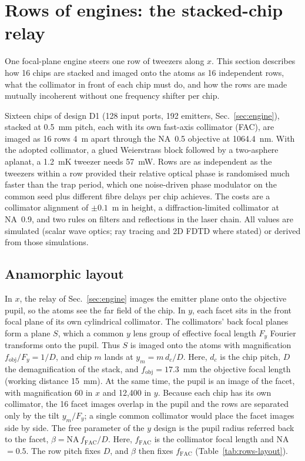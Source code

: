 \section{Rows of engines: the stacked-chip relay}\label{sec:rows}

One focal-plane engine steers one row of tweezers along $x$. This section describes how 16 chips are stacked
and imaged onto the atoms as 16 independent rows, what the collimator in front of each chip must do, and how
the rows are made mutually incoherent without one frequency shifter per chip.

Sixteen chips of design D1 (128 input ports, 192 emitters, Sec.~\ref{sec:engine}), stacked at 0.5~mm pitch,
each with its own fast-axis collimator (FAC), are imaged as 16 rows 4~\textmu m apart through the NA~0.5
objective at 1064.4~nm. With the adopted collimator, a glued Weierstrass block followed by a two-asphere
aplanat, a 1.2~mK tweezer needs 57~mW. Rows are as independent as the tweezers within a row provided their
relative optical phase is randomised much faster than the trap period, which one noise-driven phase modulator
on the common seed plus different fibre delays per chip achieves. The costs are a collimator alignment of
$\pm0.1$~\textmu m in height, a diffraction-limited collimator at NA~0.9, and two rules on filters and
reflections in the laser chain. All values are simulated (scalar wave optics; ray tracing and 2D FDTD where
stated) or derived from those simulations.

\subsection{Anamorphic layout}\label{sec:rows-layout}

In $x$, the relay of Sec.~\ref{sec:engine} images the emitter plane onto the objective pupil, so the atoms see
the far field of the chip. In $y$, each facet sits in the front focal plane of its own cylindrical collimator.
The collimators' back focal planes form a plane $S$, which a common $y$ lens group of effective focal length
$F_y$ Fourier transforms onto the pupil. Thus $S$ is imaged onto the atoms with magnification
$f_\mathrm{obj}/F_y=1/D$, and chip $m$ lands at $y_m=m\,d_c/D$. Here, $d_c$ is the chip pitch, $D$ the
demagnification of the stack, and $f_\mathrm{obj}=17.3$~mm the objective focal length (working distance 15~mm).
At the same time, the pupil is an image of the facet, with magnification 60 in $x$ and 12,400 in $y$. Because
each chip has its own collimator, the 16 facet images overlap in the pupil and the rows are separated only by
the tilt $y_m/F_y$; a single common collimator would place the facet images side by side. The free parameter
of the $y$ design is the pupil radius referred back to the facet, $\beta=\mathrm{NA}\,f_\mathrm{FAC}/D$. Here,
$f_\mathrm{FAC}$ is the collimator focal length and NA~$=0.5$. The row pitch fixes $D$, and $\beta$ then fixes
$f_\mathrm{FAC}$ (Table~\ref{tab:rows-layout}).

